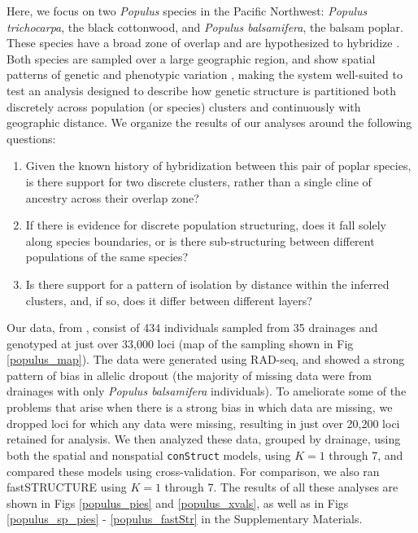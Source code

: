 \documentclass[12pt]{article}
\begin{document}
Here, we focus on two \textit{Populus} species in the Pacific Northwest: 
\textit{Populus trichocarpa}, the black cottonwood,
and \textit{Populus balsamifera}, the balsam poplar.
These species have a broad zone of overlap and are hypothesized to hybridize \citep{geraldes_etal_2014, suarezgonzalez_etal_2016}.
Both species are sampled over a large geographic region, 
and show spatial patterns of genetic and phenotypic variation \citep{slavov_etal_2012, mckown_etal_2013},
making the system well-suited to test an analysis designed to describe
how genetic structure is partitioned both discretely across population (or species) clusters
and continuously with geographic distance.
We organize the results of our analyses around the following questions: 
\begin{enumerate}
\item Given the known history of hybridization between this pair of poplar species, 
is there support for two discrete clusters, 
rather than a single cline of ancestry across their overlap zone?
\item If there is evidence for discrete population structuring, 
does it fall solely along species boundaries, 
or is there sub-structuring between different populations of the same species?
\item Is there support for a pattern of isolation by distance within
the inferred clusters, and, if so, 
does it differ between different layers?
\end{enumerate}

Our data, from \cite{geraldes_etal_2014}, 
consist of 434 individuals sampled from 35 drainages 
and genotyped at just over 33,000 loci (map of the sampling shown in Fig \ref{populus_map}).
The data were generated using RAD-seq, 
and showed a strong pattern of bias in allelic dropout 
(the majority of missing data were from drainages with only \textit{Populus balsamifera} individuals).
To ameliorate some of the problems that arise when there is a strong bias in which data are missing, 
we dropped loci for which any data were missing, 
resulting in just over 20,200 loci retained for analysis.  
We then analyzed these data, grouped by drainage, using both the spatial and nonspatial \texttt{conStruct} models, 
using $K = 1$ through 7,
and compared these models using cross-validation.
For comparison, we also ran fastSTRUCTURE \citep{fastStructure} 
using $K = 1$ through 7.
The results of all these analyses are shown in 
Figs \ref{populus_pies} and \ref{populus_xvals}, 
as well as in Figs \ref{populus_sp_pies} - \ref{populus_fastStr} in the Supplementary Materials.
\end{document}
